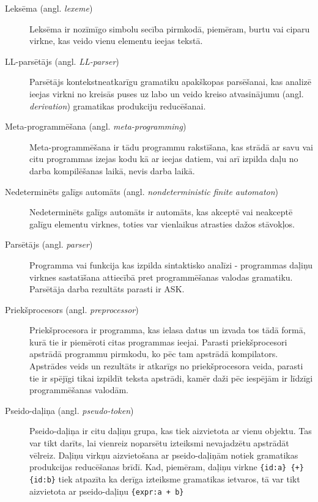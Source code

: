 \begin{description}
\item[Leksēma (angl. \emph{lexeme})]
Leksēma ir nozīmīgo simbolu secība pirmkodā, piemēram, burtu vai ciparu virkne, kas veido vienu elementu ieejas tekstā.

\item[LL-parsētājs (angl. \emph{LL-parser})]
Parsētājs kontekstneatkarīgu gramatiku apakškopas parsēšanai, kas analizē ieejas virkni no kreisās puses uz labo un veido kreiso atvasinājumu (angl. \emph{derivation}) gramatikas produkciju reducēšanai.

\item[Meta-programmēšana (angl. \emph{meta-programming})]
Meta-programmēšana ir tādu programmu rakstīšana, kas strādā ar savu vai citu programmas izejas kodu kā ar ieejas datiem, vai arī izpilda daļu no darba kompilēšanas laikā, nevis darba laikā.

\item[Nedeterminēts galīgs automāts (angl. \emph{nondeterministic finite automaton})]
Nedeterminēts galīgs automāts ir automāts, kas akceptē vai neakceptē galīgu elementu virknes, toties var vienlaikus atrasties dažos stāvokļos.~\cite{Hopcroft:IntroAutomataTheory}

\item[Parsētājs (angl. \emph{parser})]
Programma vai funkcija kas izpilda sintaktisko analīzi - programmas daļiņu virknes sastatīšana attiecībā pret programmēšanas valodas gramatiku. Parsētāja darba rezultāts parasti ir ASK.

\item[Priekšprocesors (angl. \emph{preprocessor})]
Priekšprocesora ir programma, kas ielasa datus un izvada tos tādā formā, kurā tie ir piemēroti citas programmas ieejai. Parasti priekšprocesori apstrādā programmu pirmkodu, ko pēc tam apstrādā kompilators. Apstrādes veids un rezultāts ir atkarīgs no priekšprocesora veida, parasti tie ir spējīgi tikai izpildīt teksta apstrādi, kamēr daži pēc iespējām ir līdzīgi programmēšanas valodām.

\item[Pseido-daļiņa (angl. \emph{pseudo-token})]
Pseido-daļiņa ir citu daļiņu grupa, kas tiek aizvietota ar vienu objektu. Tas var tikt darīts, lai vienreiz noparsētu izteiksmi nevajadzētu apstrādāt vēlreiz. Daļiņu virkņu aizvietošana ar pseido-daļiņām notiek gramatikas produkcijas reducēšanas brīdī. Kad, piemēram, daļiņu virkne \texttt{\{id:a\} \{+\} \{id:b\}} tiek atpazīta ka derīga izteiksme gramatikas ietvaros, tā var tikt aizvietota ar pseido-daļiņu \texttt{\{expr:a + b\}}


\end{description}
